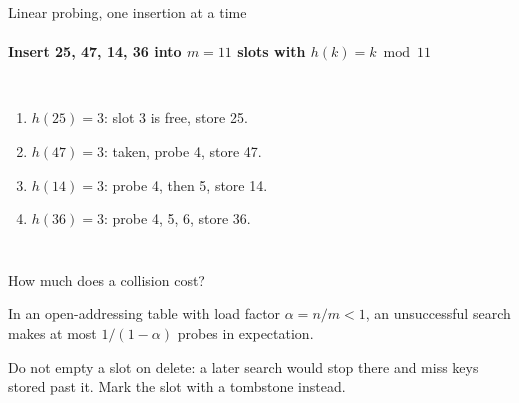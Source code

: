 \documentclass[aspectratio=169,11pt,t]{beamer}
\begin{document}
\begin{frame}{Linear probing, one insertion at a time}
  \framesubtitle{Insert 25, 47, 14, 36 into $m = 11$ slots with $h(k) = k \bmod 11$}
  \vspace{2mm}
  \begin{columns}[T,onlytextwidth]
      \begin{enumerate}\small
        \item<1-> $h(25) = 3$: slot 3 is free, store 25.
        \item<2-> $h(47) = 3$: taken, probe 4, store 47.
        \item<3-> $h(14) = 3$: probe 4, then 5, store 14.
        \item<4-> $h(36) = 3$: probe 4, 5, 6, store 36.
      \end{enumerate}
      \vspace{1mm}
  \end{columns}
  \vspace{3mm}
\end{frame}

\begin{frame}{How much does a collision cost?}
  \begin{theorembox}
    In an open-addressing table with load factor $\alpha = n/m < 1$, an unsuccessful
    search makes at most $1/(1-\alpha)$ probes in expectation.
  \end{theorembox}
  \begin{warningbox}
    Do not empty a slot on delete: a later search would stop there and miss keys
    stored past it. Mark the slot with a tombstone instead.
  \end{warningbox}
\end{frame}
\end{document}
